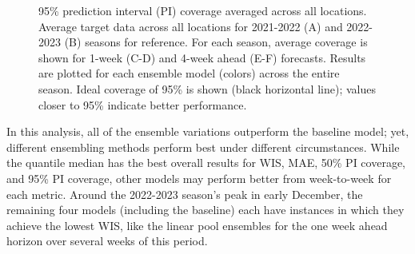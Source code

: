 \documentclass[
  article,
  shortnames,
  notitle]{jss}
\begin{document}
\begin{figure}


\caption{\label{fig-cov95-vs-forecast-date}95\% prediction interval (PI)
coverage averaged across all locations. Average target data across all
locations for 2021-2022 (A) and 2022-2023 (B) seasons for reference. For
each season, average coverage is shown for 1-week (C-D) and 4-week ahead
(E-F) forecasts. Results are plotted for each ensemble model (colors)
across the entire season. Ideal coverage of 95\% is shown (black
horizontal line); values closer to 95\% indicate better performance.}

\end{figure}%

In this analysis, all of the ensemble variations outperform the baseline
model; yet, different ensembling methods perform best under different
circumstances. While the quantile median has the best overall results
for WIS, MAE, 50\% PI coverage, and 95\% PI coverage, other models may
perform better from week-to-week for each metric. Around the 2022-2023
season's peak in early December, the remaining four models (including
the baseline) each have instances in which they achieve the lowest WIS,
like the linear pool ensembles for the one week ahead horizon over
several weeks of this period.
\end{document}
